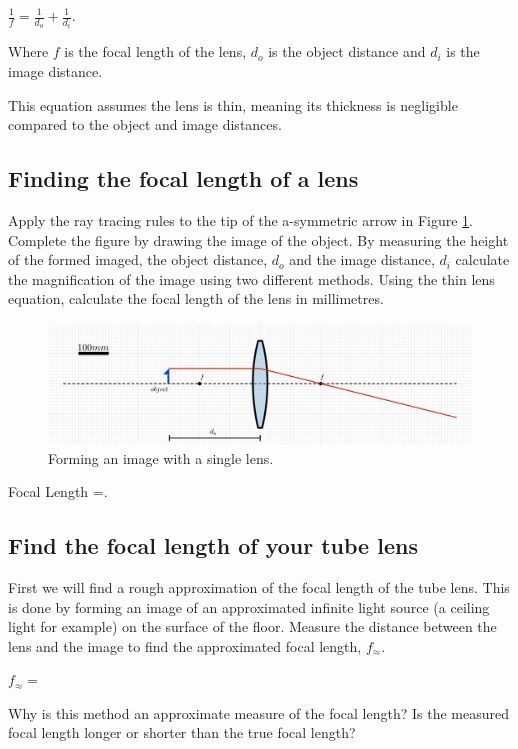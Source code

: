 \documentclass[12pt,a4paper,twoside]{article}
\begin{document}
$\frac{1}{f} = \frac{1}{d_o} + \frac{1}{d_i}$.

Where $f$ is the focal length of the lens, $d_o$ is the object distance and $d_i$ is the image distance.

This equation assumes the lens is thin, meaning its thickness is negligible compared to the object and image distances.

\subsection{Finding the focal length of a lens}

Apply the ray tracing rules to the tip of the a-symmetric arrow in Figure \ref{fig:Single Lens Imaging}. Complete the figure by drawing the image of the object. By measuring the height of the formed imaged, the object distance, $d_o$ and the image distance, $d_i$ calculate the magnification of the image using two different methods. Using the thin lens equation, calculate the focal length of the lens in millimetres.

\begin{figure}
    \centering
    \includegraphics[width=1\linewidth]{Single Lens Imaging.pdf}
    \caption{Forming an image with a single lens.} 
    \label{fig:Single Lens Imaging}
\end{figure}

Focal Length =.        
\subsection{Find the focal length of your tube lens}

First we will find a rough approximation of the focal length of the tube lens. This is done by forming an image of an approximated infinite light source (a ceiling light for example) on the surface of the floor. Measure the distance between the lens and the image to find the approximated focal length, $f_{\approx}$.

$f_{\approx} =$

Why is this method an approximate measure of the focal length?
Is the measured focal length longer or shorter than the true focal length?
        \vspace{2cm}
\end{document}
